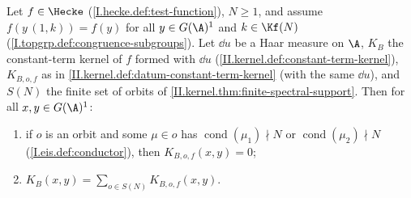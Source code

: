Let $f\in\Hecke$ (\cref{I.hecke.def:test-function}), $N\ge1$, and assume $f(y\,(1,k))=f(y)$ for all $y\in G(\A)^1$ and $k\in\Kf(N)$
(\cref{I.topgrp.def:congruence-subgroups}). Let $\dd u$ be a Haar measure on $\A$, $K_B$ the constant-term kernel of $f$ formed with $\dd u$
(\cref{II.kernel.def:constant-term-kernel}), $K_{B,o,f}$ as in \cref{II.kernel.def:datum-constant-term-kernel} (with the same $\dd u$), and $S(N)$ the finite set of orbits
of \cref{II.kernel.thm:finite-spectral-support}. Then for all $x,y\in G(\A)^1$:
\begin{enumerate}[label=(\alph*)]
\item if $o$ is an orbit and some $\mu\in o$ has $\operatorname{cond}(\mu_1)\nmid N$ or $\operatorname{cond}(\mu_2)\nmid N$ (\cref{I.eis.def:conductor}), then
  $K_{B,o,f}(x,y)=0$;
\item $\displaystyle K_B(x,y)=\sum_{o\in S(N)}K_{B,o,f}(x,y)$.
\end{enumerate}
